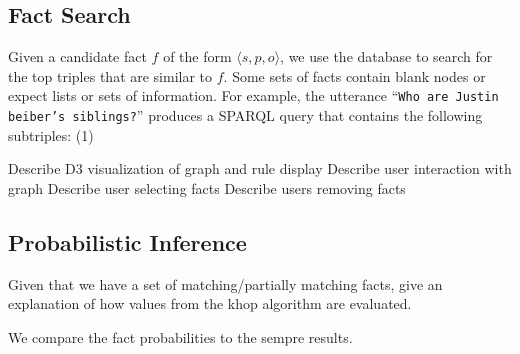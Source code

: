 



\subsection{Fact Search}
\label{sec:probqa-search}

Given a candidate fact \(f\) of the form \(\langle s, p, o \rangle\), we use the
database to search for the top triples that are similar to \(f\).
Some sets of facts contain blank nodes or expect lists or sets of information.
For example, the utterance ``\texttt{Who are Justin beiber's siblings?}'' produces 
a SPARQL query that contains the following subtriples: (1)  

Describe D3 visualization of graph and rule display
Describe user interaction with graph
Describe user selecting facts
Describe users removing facts


\subsection{Probabilistic Inference}
\label{sec:probqa-inference}
Given that we have a set of matching/partially matching facts, give an explanation of how values from the khop algorithm are evaluated.

We compare the fact probabilities to the sempre results.

